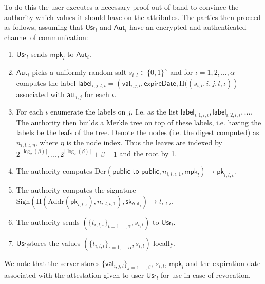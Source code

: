 \documentclass[11pt]{article} %
\newcommand{\Hash}{\ensuremath{\mathrm{H}}}
\newcommand{\aut}{\ensuremath{\mathsf{Aut}_i}}
\newcommand{\att}{\ensuremath{\mathsf{att}_{i,j}}}
\newcommand{\val}{\ensuremath{\mathsf{val}_{i,j,l}}}
\newcommand{\usr}{\ensuremath{\mathsf{Usr}_l}}
\newcommand{\lab}{\ensuremath{\mathsf{label}}}
\newcommand{\mpk}{\ensuremath{\mathsf{mpk}}}
\newcommand{\pk}{\ensuremath{\mathsf{pk}}}
\newcommand{\sk}{\ensuremath{\mathsf{sk}}}
\newcommand{\expireDate}{\ensuremath{\mathsf{expireDate}}}
\newcommand{\Der}{\ensuremath{\mathrm{Der}}}
\newcommand{\Sign}{\ensuremath{\mathrm{Sign}}}
\newcommand{\Addr}{\ensuremath{\mathrm{Addr}}}
\begin{document}
To do this the user executes a necessary proof out-of-band to convince the authority which values it should have on the attributes. The parties then proceed as follows, assuming that $\usr$ and $\aut$ have an encrypted and authenticated channel of communication:
\begin{enumerate}
	\item $\usr$ sends $\mpk_l$ to $\aut$.
	\item $\aut$ picks a uniformly random salt $s_{i,l}\in\{0,1\}^\kappa$ and for $\iota=1, 2, \dots, \alpha$ computes the label $\lab_{i,j,l,\iota}=\left(\val, \expireDate, \Hash((s_{i,l}, i, j, l, \iota)\right)$ associated with $\att$ for each $\iota$.
	\item For each $\iota$ enumerate the labels on $j$. I.e. as the list $\lab_{i,1,l,\iota}, \lab_{i,2,l,\iota}, \dots$. The authority then builds a Merkle tree on top of these labels, i.e. having the labels be the leafs of the tree. Denote the nodes (i.e. the digest computed) as $n_{i,l,\iota, \eta}$, where $\eta$ is the node index. Thus the leaves are indexed by $2^{\lceil\log_2(\beta)\rceil}, \dots, 2^{\lceil\log_2(\beta)\rceil}+\beta-1$ and the root by 1.
	\item The authority computes $\Der(\mathsf{public}\mbox{-} \mathsf{to}\mbox{-} \mathsf{public}, n_{i,l,\iota, 1}, \mpk_l)\to \pk_{i,l,\iota}$.
	\item The authority computes the signature $\Sign\left( \Hash\left(\Addr(\pk_{i,l,\iota}), n_{i,l,\iota, 1}\right), \sk_{\aut}\right)\to t_{i,l,\iota}$.
	\item The authority sends $(\{t_{i,l,\iota}\}_{\iota = 1, \dots, \alpha}, s_{i,l})$ to $\usr$.
	\item \usr stores the values $(\{t_{i,l,\iota}\}_{\iota = 1, \dots, \alpha}, s_{i,l})$ locally.
\end{enumerate}
We note that the server stores $\{\val\}_{j=1, \dots, \beta}$, $s_{i,l}$, $\mpk_l$ and the expiration date associated with the attestation given to user $\usr$ for use in case of revocation.
\end{document}
